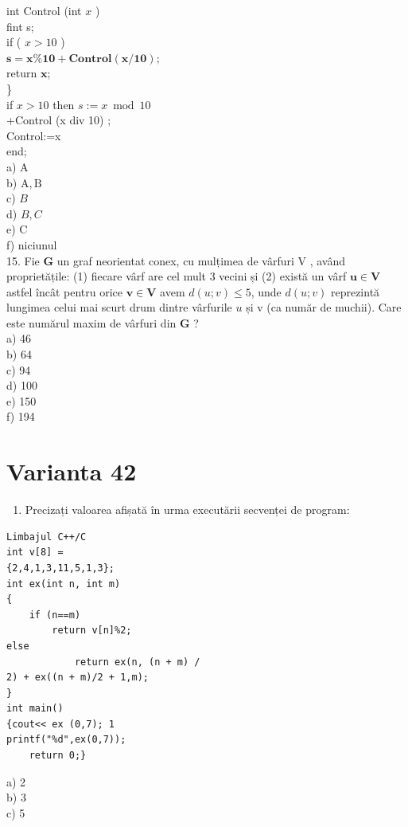 \documentclass[10pt]{article}
\begin{document}
int Control (int $x$ )\\
fint s;\\
if ( $x>10$ )\\
$\mathbf{s = x \% 1 0 + C o n t r o l ( x / 1 0 ) ; ~}$\\
return $\mathbf{x}$;\\
\}\\
if $x>10$ then $s:=x \bmod 10$\\
+Control (x div 10) ;\\
Control:=x\\
end;\\
a) A\\
b) $\mathrm{A}, \mathrm{B}$\\
c) $B$\\
d) $B, C$\\
e) C\\
f) niciunul\\
15. Fie $\mathbf{G}$ un graf neorientat conex, cu mulțimea de vârfuri V , având proprietățile: (1) fiecare vârf are cel mult 3 vecini și (2) există un vârf $\mathbf{u} \in \mathbf{V}$ astfel încât pentru orice $\mathbf{v} \in \mathbf{V}$ avem $d(u ; v) \leq 5$, unde $d(u ; v)$ reprezintă lungimea celui mai scurt drum dintre vârfurile $u$ și v (ca număr de muchii). Care este numărul maxim de vârfuri din $\mathbf{G}$ ?\\
a) 46\\
b) 64\\
c) 94\\
d) 100\\
e) 150\\
f) 194

\section*{Varianta 42}
\begin{enumerate}
  \item Precizați valoarea afișată în urma executării secvenței de program:
\end{enumerate}

\begin{verbatim}
Limbajul C++/C
int v[8] =
{2,4,1,3,11,5,1,3};
int ex(int n, int m)
{
    if (n==m)
        return v[n]%2;
else
            return ex(n, (n + m) /
2) + ex((n + m)/2 + 1,m);
}
int main()
{cout<< ex (0,7); 1
printf("%d",ex(0,7));
    return 0;}
\end{verbatim}

a) 2\\
b) 3\\
c) 5
\end{document}
